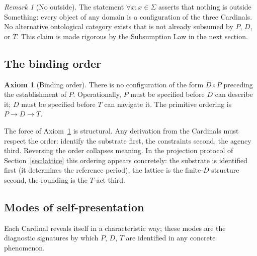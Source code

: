 \documentclass[11pt,a4paper]{article}
\theoremstyle{definition}
\newtheorem{axiom}[theorem]{Axiom}
\theoremstyle{remark}
\newtheorem{remark}[theorem]{Remark}
\begin{document}
\begin{remark}[No outside]
The statement $\forall x : x \in \Sigma$ asserts that nothing is outside Something: every object of any domain is a configuration of the three Cardinals. No alternative ontological category exists that is not already subsumed by $P$, $D$, or $T$. This claim is made rigorous by the Subsumption Law in the next section.
\end{remark}

\subsection{The binding order}

\begin{axiom}[Binding order]\label{ax:order}
There is no configuration of the form $D \circ P$ preceding the establishment of $P$. Operationally, $P$ must be specified before $D$ can describe it; $D$ must be specified before $T$ can navigate it. The primitive ordering is $P \to D \to T$.
\end{axiom}

The force of Axiom~\ref{ax:order} is structural. Any derivation from the Cardinals must respect the order: identify the substrate first, the constraints second, the agency third. Reversing the order collapses meaning. In the projection protocol of Section~\ref{sec:lattice} this ordering appears concretely: the substrate is identified first (it determines the reference period), the lattice is the finite-$D$ structure second, the rounding is the $T$-act third.

\subsection{Modes of self-presentation}\label{subsec:modes}

Each Cardinal reveals itself in a characteristic way; these modes are the diagnostic signatures by which $P$, $D$, $T$ are identified in any concrete phenomenon.
\end{document}
